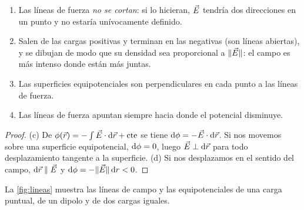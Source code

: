 \begin{proposicion}\label{prop:lineas}
\begin{enumerate}[label=(\alph*)]
  \item Las líneas de fuerza \emph{no se cortan}: si lo hicieran, $\vec{E}$ tendría dos direcciones en un punto y no estaría unívocamente definido.
  \item Salen de las cargas positivas y terminan en las negativas (son líneas abiertas), y se dibujan de modo que su densidad sea
        proporcional a $\lVert \vec{E}\rVert$: el campo es más intenso donde están más juntas.
  \item Las superficies equipotenciales son perpendiculares en cada punto a las líneas de fuerza.
  \item Las líneas de fuerza apuntan siempre hacia donde el potencial disminuye.
\end{enumerate}
\end{proposicion}
\begin{proof}
(c) De $\phi(\vec{r})=-\int\vec{E}\cdot\mathrm{d}\vec{r}+\text{cte}$ se tiene $\mathrm{d}\phi=-\vec{E}\cdot\mathrm{d}\vec{r}$. Si nos movemos sobre una superficie equipotencial,
$\mathrm{d}\phi=0$, luego $\vec{E}\perp\mathrm{d}\vec{r}$ para todo desplazamiento tangente a la superficie. (d) Si nos desplazamos en el sentido del campo,
$\mathrm{d}\vec{r}\parallel\vec{E}$ y $\mathrm{d}\phi=-\lVert \vec{E}\rVert\,\mathrm{d} r<0$.
\end{proof}

La \cref{fig:lineas} muestra las líneas de campo y las equipotenciales de una carga puntual, de un dipolo y de dos cargas iguales.


